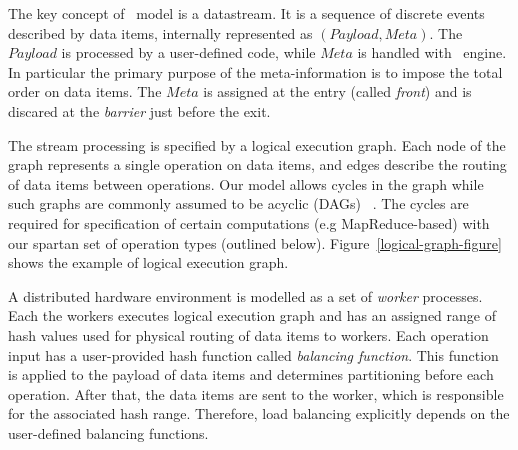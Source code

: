 
The key concept of \FlameStream\ model is a datastream. It is a sequence of discrete events described by data items, internally represented as 
$(Payload, Meta).$
The $Payload$ is processed by a user-defined code, while $Meta$ is handled with \FlameStream\ engine. In particular
the primary purpose of the meta-information is to impose the total order on data items. 
The  $Meta$ is assigned at the entry (called {\em  front}) and is discared at the {\em barrier} just before the exit. 

The stream processing is specified by a logical execution graph. 
Each node of the graph represents a single operation on data items, and edges describe the routing of data items between operations.  
Our model allows cycles in the graph while such graphs are commonly assumed to be acyclic (DAGs) 
~\cite{Zaharia:2016:ASU:3013530.2934664, Carbone:2017:SMA:3137765.3137777}. 
The cycles are required for specification of certain computations (e.g MapReduce-based) with our spartan set of operation types (outlined below).
Figure~\ref{logical-graph-figure} shows the example of logical execution graph.

A distributed hardware environment is modelled as a set of {\em worker} processes. 
Each the workers executes logical execution graph and has an assigned range of hash values used for physical routing of data items to workers. 
%
Each operation input has a user-provided hash function called {\it balancing function}. This function is applied to the payload of data items and determines partitioning before each operation. After that, the data items are sent to the worker, which is responsible for the associated hash range. Therefore, load balancing explicitly depends on the user-defined balancing functions. 

